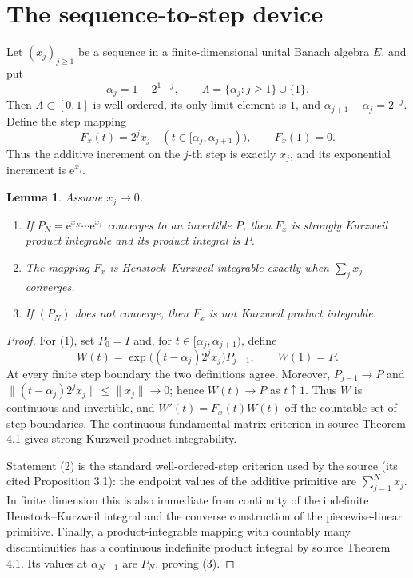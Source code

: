 \documentclass[10pt,a4paper]{article}
\newtheorem{lemma}[theorem]{Lemma}
\newcommand{\e}{\mathrm e}
\newcommand{\Id}{I}
\begin{document}
\section{The sequence-to-step device}

Let \((x_j)_{j\geq1}\) be a sequence in a finite-dimensional unital Banach
algebra \(E\), and put
\[
 \alpha_j=1-2^{1-j},\qquad
 \Lambda=\{\alpha_j:j\geq1\}\cup\{1\}.
\]
Then \(\Lambda\subset[0,1]\) is well ordered, its only limit element is \(1\),
and \(\alpha_{j+1}-\alpha_j=2^{-j}\).  Define the step mapping
\begin{equation}\label{eq:embed}
 F_x(t)=2^j x_j\quad(t\in[\alpha_j,\alpha_{j+1})),
 \qquad F_x(1)=0.
\end{equation}
Thus the additive increment on the \(j\)-th step is exactly \(x_j\), and its
exponential increment is \(\e^{x_j}\).

\begin{lemma}\label{lem:device}
Assume \(x_j\to0\).
\begin{enumerate}
\item If \(P_N=\e^{x_N}\cdots\e^{x_1}\) converges to an invertible \(P\),
then \(F_x\) is strongly Kurzweil product integrable and its product integral
is \(P\).
\item The mapping \(F_x\) is Henstock--Kurzweil integrable exactly when
\(\sum_jx_j\) converges.
\item If \((P_N)\) does not converge, then \(F_x\) is not Kurzweil product
integrable.
\end{enumerate}
\end{lemma}

\begin{proof}
For (1), set \(P_0=\Id\) and, for
\(t\in[\alpha_j,\alpha_{j+1})\), define
\[
 W(t)=\exp\!\big((t-\alpha_j)2^jx_j\big)P_{j-1},
 \qquad W(1)=P.
\]
At every finite step boundary the two definitions agree.  Moreover,
\(P_{j-1}\to P\) and
\(\|(t-\alpha_j)2^jx_j\|\leq\|x_j\|\to0\); hence \(W(t)\to P\) as
\(t\uparrow1\).  Thus \(W\) is continuous and invertible, and
\(W'(t)=F_x(t)W(t)\) off the countable set of step boundaries.  The continuous
fundamental-matrix criterion in source Theorem 4.1 gives strong Kurzweil
product integrability.

Statement (2) is the standard well-ordered-step criterion used by the source
(its cited Proposition 3.1): the endpoint values of the additive primitive are
\(\sum_{j=1}^N x_j\).  In finite dimension this is also immediate from
continuity of the indefinite Henstock--Kurzweil integral and the converse
construction of the piecewise-linear primitive.  Finally, a product-integrable
mapping with countably many discontinuities has a continuous indefinite
product integral by source Theorem 4.1.  Its values at \(\alpha_{N+1}\) are
\(P_N\), proving (3).
\end{proof}
\end{document}
